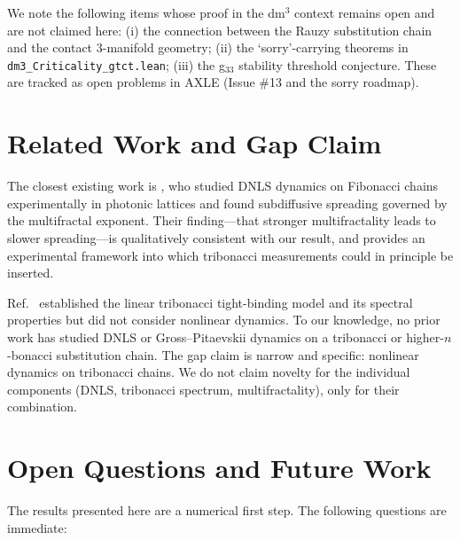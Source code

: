 \documentclass[12pt,a4paper]{article}
\begin{document}
We note the following items whose proof in the dm$^3$ context remains open
and are not claimed here: (i) the connection between the Rauzy substitution
chain and the contact 3-manifold geometry; (ii) the `sorry'-carrying theorems
in \texttt{dm3\_Criticality\_gtct.lean}; (iii) the g$_{33}$ stability
threshold conjecture. These are tracked as open problems in AXLE
\cite{AXLE2026} (Issue \#13 and the sorry roadmap).

\section{Related Work and Gap Claim}

The closest existing work is \cite{Lahini2009}, who studied DNLS dynamics on
Fibonacci chains experimentally in photonic lattices and found subdiffusive
spreading governed by the multifractal exponent. Their finding---that stronger
multifractality leads to slower spreading---is qualitatively consistent with
our result, and provides an experimental framework into which tribonacci
measurements could in principle be inserted.

Ref.~\cite{Krebbekx2023} established the linear tribonacci tight-binding
model and its spectral properties but did not consider nonlinear dynamics.
To our knowledge, no prior work has studied DNLS or Gross--Pitaevskii
dynamics on a tribonacci or higher-$n$-bonacci substitution chain. The gap
claim is narrow and specific: nonlinear dynamics on tribonacci chains. We do
not claim novelty for the individual components (DNLS, tribonacci spectrum,
multifractality), only for their combination.

\section{Open Questions and Future Work}

The results presented here are a numerical first step. The following questions
are immediate:
\end{document}
